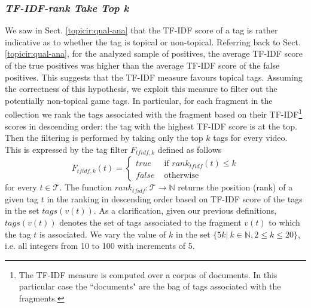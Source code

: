 \subsubsection{\textit{TF-IDF-rank Take Top k}}
We saw in Sect. \ref{topicir:qual-ana} that the TF-IDF score of a tag is rather indicative as to whether the tag is topical or non-topical. Referring back to Sect. \ref{topicir:qual-ana}, for the analyzed sample of positives, the average TF-IDF score of the true positives was higher than the average TF-IDF score of the false positives. This suggests that the TF-IDF measure favours topical tags. Assuming the correctness of this hypothesis, we exploit this measure to filter out the potentially non-topical game tags.  
In particular, for each fragment in the collection we rank the tags associated with the fragment based on their TF-IDF\footnote{The TF-IDF measure is computed over a corpus of documents. In this particular case the ``documents" are the bag of tags associated with the fragments.} scores in descending order: the tag with the highest TF-IDF score is at the top. Then the filtering is performed by taking only the top $k$ tags for every video. This is expressed by the tag filter $F_{tfidf,k}$ defined as follows
\begin{equation}
F_{tfidf,k}(t) = \left\{ 
	\begin{array}{rl}
	true &\mbox{ if $rank_{tfidf}(t) \leq k$} \\
	false &\mbox{ otherwise}
	\end{array}
\right.
\end{equation}
for every $t \in \mathcal{T}$. The function $rank_{tfidf}: \mathcal{T} \rightarrow \mathbb{N}$ returns the  position (rank) of a given tag $t$ in the ranking in descending order based on TF-IDF score of the tags in the set $tags(v(t))$. As a clarification, given our previous definitions, $tags(v(t))$ denotes the set of tags associated to the fragment $v(t)$ to which the tag $t$ is associated. We vary the value of $k$ in the set $\{5k|~k\in \mathbb{N}, 2 \leq k \leq 20\}$, i.e. all integers from 10 to 100 with increments of 5.

